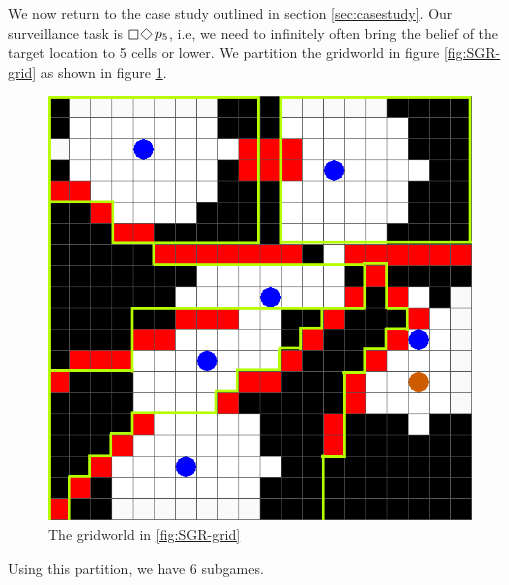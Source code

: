 We now return to the case study outlined in section \ref{sec:casestudy}. Our surveillance task is $\LTLsquare \LTLdiamond p_5$, i.e, we need to infinitely often bring the belief of the target location to 5 cells or lower. We partition the gridworld in figure \ref{fig:SGR-grid} as shown in figure \ref{fig:experiment}.

\begin{figure}
\centering
\includegraphics[scale=0.2]{figs/SGR-grid-vis-part.png}
\caption{The gridworld in \ref{fig:SGR-grid}}
\label{fig:experiment}
\end{figure}

Using this partition, we have 6 subgames. 